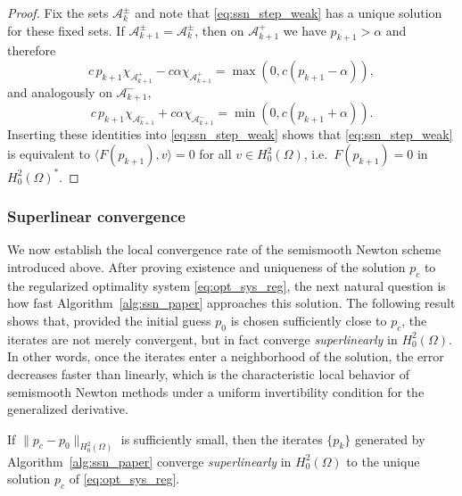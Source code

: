 \documentclass[11pt,a4paper]{article}
\begin{document}
\begin{proof}
Fix the sets $\mathcal{A}_k^\pm$ and note that \eqref{eq:ssn_step_weak} has a unique solution for these fixed sets.
If $\mathcal{A}_{k+1}^\pm=\mathcal{A}_k^\pm$, then on $\mathcal{A}_{k+1}^+$ we have $p_{k+1}>\alpha$ and therefore
\[
c\,p_{k+1}\chi_{\mathcal{A}_{k+1}^+}-c\alpha\chi_{\mathcal{A}_{k+1}^+}=\max(0,c(p_{k+1}-\alpha)),
\]
and analogously on $\mathcal{A}_{k+1}^-$,
\[
c\,p_{k+1}\chi_{\mathcal{A}_{k+1}^-}+c\alpha\chi_{\mathcal{A}_{k+1}^-}=\min(0,c(p_{k+1}+\alpha)).
\]
Inserting these identities into \eqref{eq:ssn_step_weak} shows that \eqref{eq:ssn_step_weak} is equivalent to
$\langle F(p_{k+1}),v\rangle=0$ for all $v\in H_0^2(\Omega)$, i.e.\ $F(p_{k+1})=0$ in $H_0^2(\Omega)^\ast$.
\end{proof}

\subsubsection{Superlinear convergence}
We now establish the local convergence rate of the semismooth Newton scheme introduced above.
After proving existence and uniqueness of the solution $p_c$ to the regularized optimality system
\eqref{eq:opt_sys_reg}, the next natural question is how fast Algorithm~\ref{alg:ssn_paper}
approaches this solution. The following result shows that, provided the initial guess $p_0$
is chosen sufficiently close to $p_c$, the iterates are not merely convergent, but in fact
converge \emph{superlinearly} in $H_0^2(\Omega)$. In other words, once the iterates enter a
neighborhood of the solution, the error decreases faster than linearly, which is the characteristic
local behavior of semismooth Newton methods under a uniform invertibility condition for the
generalized derivative.

\begin{theorem}
\label{thm:ssn_superlinear_paper}
If $\|p_c-p_0\|_{H_0^2(\Omega)}$ is sufficiently small, then the iterates $\{p_k\}$ generated by
Algorithm~\ref{alg:ssn_paper} converge \emph{superlinearly} in $H_0^2(\Omega)$ to the unique solution $p_c$ of \eqref{eq:opt_sys_reg}.
\end{theorem}
\end{document}
